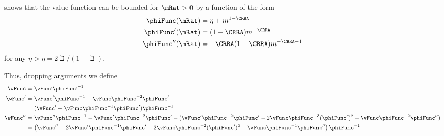\documentclass{\handout}
\begin{document}
\begin{CDCPrivate}
\cite{BufferStockTheory} shows that the 
value function can be bounded for $\mRat>0$ by a function of the form 
\begin{equation}\begin{gathered}\begin{aligned}
  \label{eq:phiFunc}
  \phiFunc(\mRat) & =  \eta + m^{1-\CRRA}
 \\ \phiFunc^{\prime}(\mRat) & =  (1-\CRRA) m^{-\CRRA}
 \\ \phiFunc^{\prime\prime}(\mRat) & =  -\CRRA (1-\CRRA)m^{-\CRRA-1}
\end{aligned}\end{gathered}\end{equation}
for any $\eta > \underline{\eta} = 2 \beth/(1-\beth)$.

Thus, dropping arguments we define 
\begin{equation}\begin{gathered}\begin{aligned}
  \label{eq:wFunc}
    \wFunc & =  \vFunc\phiFunc^{-1}
\\  \wFunc^{\prime} & =  \vFunc^{\prime}\phiFunc^{-1}-\vFunc\phiFunc^{-2}\phiFunc^{\prime}
\\   & =  (\vFunc^{\prime}-\vFunc\phiFunc^{-1}\phiFunc^{\prime})\phiFunc^{-1}
\\  \wFunc^{\prime\prime} & =  \vFunc^{\prime\prime}\phiFunc^{-1}-\vFunc^{\prime}\phiFunc^{-2}\phiFunc^{\prime}-(\vFunc^{\prime}\phiFunc^{-2}\phiFunc^{\prime}-2 \vFunc\phiFunc^{-3}(\phiFunc^{\prime})^{2}+\vFunc\phiFunc^{-2}\phiFunc^{\prime\prime})
\\  & =  \left(\vFunc^{\prime\prime}-2\vFunc^{\prime}\phiFunc^{-1}\phiFunc^{\prime}+2 \vFunc\phiFunc^{-2}(\phiFunc^{\prime})^{2}-\vFunc\phiFunc^{-1}\phiFunc^{\prime\prime}\right)\phiFunc^{-1}
\end{aligned}\end{gathered}\end{equation}


\end{CDCPrivate}
\end{document}

